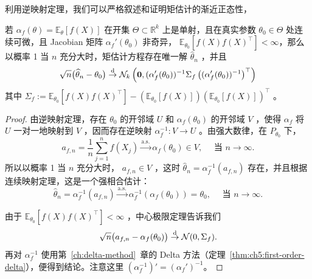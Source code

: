 利用逆映射定理，我们可以严格叙述和证明矩估计的渐近正态性，


\begin{theorem}[矩估计的相合性和渐近正态性]\label{thm:ch6:mom-asymptotic-normality}

若 $\alpha_f(\theta) = \mathbb{E}_\theta [f(X)]$ 在开集 $\Theta \subset \mathbb{R}^k$ 上是单射，且在真实参数 $\theta_0\in\Theta$ 处连续可微，且 Jacobian 矩阵 $\alpha_f'(\theta_0)$ 非奇异， $\mathbb{E}_{\theta_0}[f(X)f(X)^\top] < \infty$，那么以概率 1 当 $n$ 充分大时，矩估计方程存在唯一解 $\widehat\theta_n$ ，并且
\[\sqrt n\big(\widehat\theta_n-\theta_0\big)\overset{\rm d}\to \mathcal N_k\left(\bm 0,(\alpha_f'(\theta_0))^{-1}\Sigma_f\left((\alpha_f'(\theta_0))^{-1}\right)^\top\right)\]
其中 $\Sigma_f:=\mathbb{E}_{\theta_0}[f(X)f(X)^\top]-(\mathbb{E}_{\theta_0}[f(X)])(\mathbb{E}_{\theta_0}[f(X)])^\top$ 。

\end{theorem}

\begin{proof}

由逆映射定理，存在 $\theta_0$ 的开邻域 $U$ 和 $\alpha_f(\theta_0)$ 的开邻域 $V$ ，使得 $\alpha_f$ 将 $U$ 一对一地映射到 $V$ ，因而存在逆映射 $\alpha_f^{-1}:V\to U$ 。由强大数律，在 $P_{\theta_0}$ 下，
\[
a_{f,n}=\frac1n\sum_{j=1}^nf(X_j)\overset{\text{a.s.}}\to \alpha_f(\theta_0)\in V,\quad \text{ 当 }n\to\infty.
\]
所以以概率 1 当 $n$ 充分大时， $a_{f,n}\in V$ ，这时 $\widehat\theta_n=\alpha_f^{-1}(a_{f,n})$ 存在，并且根据连续映射定理，这是一个强相合估计：
\[
\widehat\theta_n=\alpha_f^{-1}(a_{f,n})\overset{\text{a.s.}}\to \alpha_f^{-1}(\alpha_f(\theta_0))=\theta_0,\quad\text{ 当 }n\to\infty.
\]

由于 $\mathbb{E}_{\theta_0}[f(X)f(X)^\top] < \infty$ ，中心极限定理告诉我们
\[
\sqrt n\big(a_{f,n}-\alpha_f(\theta_0)\big)\overset{\rm d}\to\mathcal N(0,\Sigma_f).
\]
再对 $\alpha_f^{-1}$ 使用第~\ref{ch:delta-method}~章的 Delta 方法（定理~\ref{thm:ch5:first-order-delta}），便得到结论。注意这里 $\left(\alpha_f^{-1}\right)'=\left(\alpha_f'\right)^{-1}$。

\end{proof}

